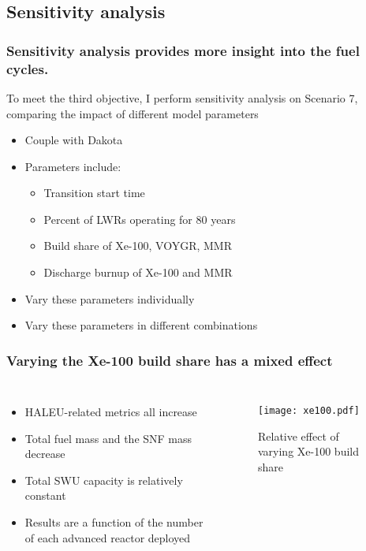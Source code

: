 \subsection{Sensitivity analysis}
\begin{frame}
    \frametitle{Sensitivity analysis provides more insight into 
    the fuel cycles.}
    To meet the third objective, I perform sensitivity analysis 
    on Scenario 7, comparing the impact of different model parameters
    \begin{itemize}
        \item Couple \Cyclus with Dakota \cite{adams_dakota_2021}
        \item Parameters include:
        \begin{itemize}
            \item Transition start time
            \item Percent of \glspl{LWR} operating for 80 years
            \item Build share of Xe-100, VOYGR, MMR
            \item Discharge burnup of Xe-100 and MMR
        \end{itemize}
        \item Vary these parameters individually
        \item Vary these parameters in different combinations
    \end{itemize}

\end{frame}

\begin{frame}
    \frametitle{Varying the Xe-100 build share has a mixed effect}
    \begin{columns}

        \column[t]{4.5cm}
        \begin{itemize}
            \item HALEU-related metrics all increase
            \item Total fuel mass and the SNF mass decrease
            \item Total SWU capacity is relatively constant
            \item Results are a function of the number of
                  each advanced reactor deployed
        \end{itemize}

    \column[t]{5.5cm}
    \begin{figure}
        \centering 
            \texttt{[image: xe100.pdf]}
            \caption{Relative effect of varying Xe-100 build share}
            \label{fig:xe100_effects}
    \end{figure}

\end{columns}
\end{frame}

